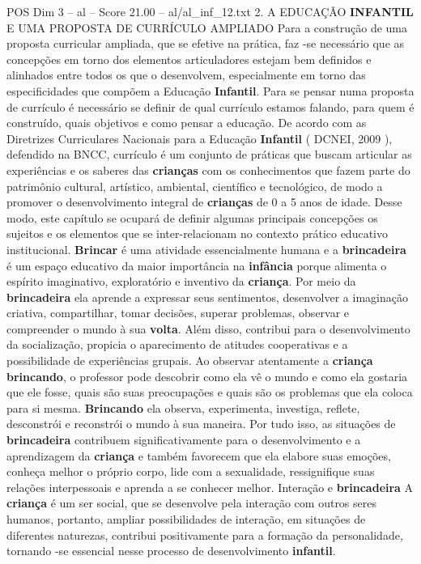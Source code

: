 \begin{textsample}{POS Dim 3 – al – Score 21.00 – al/al\_inf\_12.txt}  \label{ex:f3_pos_215}
2.
A EDUCAÇÃO \textbf{INFANTIL} E UMA PROPOSTA DE CURRÍCULO AMPLIADO Para a construção de uma proposta curricular ampliada, que se efetive na prática, faz -se necessário que as concepções em torno dos elementos articuladores estejam bem definidos e alinhados entre todos os que o desenvolvem, especialmente em torno das especificidades que compõem a Educação \textbf{Infantil}.
Para se pensar numa proposta de currículo é necessário se definir de qual currículo estamos falando, para quem é construído, quais objetivos e como pensar a educação.
De acordo com as Diretrizes Curriculares Nacionais para a Educação \textbf{Infantil} ( DCNEI, 2009 ), defendido na BNCC, currículo é um conjunto de práticas que buscam articular as experiências e os saberes das \textbf{crianças} com os conhecimentos que fazem parte do patrimônio cultural, artístico, ambiental, científico e tecnológico, de modo a promover o desenvolvimento integral de \textbf{crianças} de 0 a 5 anos de idade.
Desse modo, este capítulo se ocupará de definir algumas principais concepções os sujeitos e os elementos que se inter-relacionam no contexto prático educativo institucional. \textbf{Brincar} é uma atividade essencialmente humana e a \textbf{brincadeira} é um espaço educativo da maior importância na \textbf{infância} porque alimenta o espírito imaginativo, exploratório e inventivo da \textbf{criança}.
Por meio da \textbf{brincadeira} ela aprende a expressar seus sentimentos, desenvolver a imaginação criativa, compartilhar, tomar decisões, superar problemas, observar e compreender o mundo à sua \textbf{volta}.
Além disso, contribui para o desenvolvimento da socialização, propicia o aparecimento de atitudes cooperativas e a possibilidade de experiências grupais.
Ao observar atentamente a \textbf{criança} \textbf{brincando}, o professor pode descobrir como ela vê o mundo e como ela gostaria que ele fosse, quais são suas preocupações e quais são os problemas que ela coloca para si mesma. \textbf{Brincando} ela observa, experimenta, investiga, reflete, desconstrói e reconstrói o mundo à sua maneira.
Por tudo isso, as situações de \textbf{brincadeira} contribuem significativamente para o desenvolvimento e a aprendizagem da \textbf{criança} e também favorecem que ela elabore suas emoções, conheça melhor o próprio corpo, lide com a sexualidade, ressignifique suas relações interpessoais e aprenda a se conhecer melhor.
Interação e \textbf{brincadeira} A \textbf{criança} é um ser social, que se desenvolve pela interação com outros seres humanos, portanto, ampliar possibilidades de interação, em situações de diferentes naturezas, contribui positivamente para a formação da personalidade, tornando -se essencial nesse processo de desenvolvimento \textbf{infantil}.

\end{textsample}
